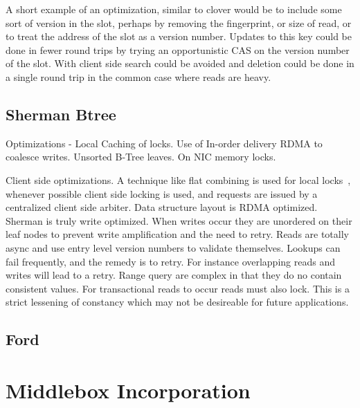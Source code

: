 A short example of an optimization, similar to clover would be to include some
sort of version in the slot, perhaps by removing the fingerprint, or size of
read, or to treat the address of the slot as a version number. Updates to this
key could be done in fewer round trips by trying an opportunistic CAS on the
version number of the slot. With client side search could be avoided and
deletion could be done in a single round trip in the common case where reads are
heavy.






\subsection{Sherman Btree}

Optimizations - Local Caching of locks. Use of In-order delivery RDMA to
coalesce writes. Unsorted B-Tree leaves. On NIC memory locks.

Client side optimizations. A technique like flat combining is used for local
locks~\cite{flat-combine}, whenever possible client side locking is used, and
requests are issued by a centralized client side arbiter. Data structure layout
is RDMA optimized. Sherman is truly write optimized. When writes occur they are
unordered on their leaf nodes to prevent write amplification and the need to
retry. Reads are totally async and use entry level version numbers to validate
themselves. Lookups can fail frequently, and the remedy is to retry. For
instance overlapping reads and writes will lead to a retry. Range query are
complex in that they do no contain consistent values. For transactional reads to
occur reads must also lock. This is a strict lessening of constancy which may
not be desireable for future applications.

\subsection{Ford}

\section{Middlebox Incorporation}

